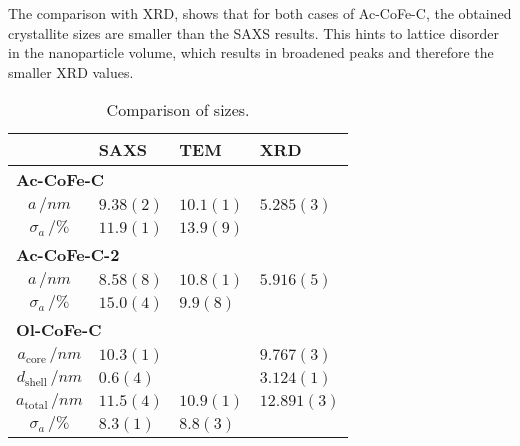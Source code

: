 \documentclass[\main/dresen_thesis.tex]{subfiles}
\begin{document}
    The comparison with XRD, shows that for both cases of Ac-CoFe-C, the obtained crystallite sizes are smaller than the SAXS results.
    This hints to lattice disorder in the nanoparticle volume, which results in broadened peaks and therefore the smaller XRD values.
    \begin{table}[!htbp]
      \centering
      \caption{\label{tab:monolayers:nanoparticle:saxs:sizeComparison}Comparison of sizes.}
      \begin{tabular}{ c | l | l | l }
                            & \textbf{SAXS} & \textbf{TEM} & \textbf{XRD}\\
        \hline
        \multicolumn{4}{l}{\textbf{Ac-CoFe-C}}\\
        \hline
        $a \, / \unit{nm}$  & $9.38(2)$       & $10.1(1)$ & $5.285(3)$\\
        $\sigma_a \, / \%$  & $11.9(1)$       & $13.9(9)$ & \\
        \hline
        \multicolumn{4}{l}{\textbf{Ac-CoFe-C-2}}\\
        \hline
        $a \, / \unit{nm}$  & $8.58(8)$       & $10.8(1)$ & $5.916(5)$\\
        $\sigma_a \, / \%$  & $15.0(4)$       & $9.9(8)$  & \\
        \hline
        \multicolumn{4}{l}{\textbf{Ol-CoFe-C}}\\
        \hline
        $a_\mathrm{core} \, / \unit{nm}$      & $10.3(1)$       &           & $9.767(3)$\\
        $d_\mathrm{shell} \, / \unit{nm}$     & $0.6(4)$        &           & $3.124(1)$\\
        $a_\mathrm{total} \, / \unit{nm}$     & $11.5(4)$       & $10.9(1)$ & $12.891(3)$\\
        $\sigma_a \, / \%$                    & $8.3(1)$        & $8.8(3)$  & \\
        \hline
      \end{tabular}
    \end{table}


\end{document}
